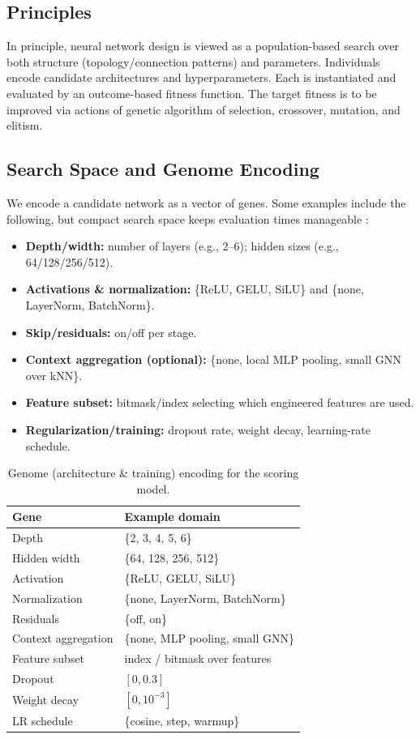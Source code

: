 \subsection{Principles}

In principle, neural network design is viewed as a population-based search over both structure (topology/connection patterns) and parameters. Individuals encode candidate architectures and hyperparameters. Each is instantiated and evaluated by an outcome-based fitness function. The target fitness is to be improved via actions of genetic algorithm of selection, crossover, mutation, and elitism.

\subsection{Search Space and Genome Encoding}

We encode a candidate network as a vector of genes. Some examples include the following, but compact search space keeps evaluation times manageable \cite{WSS+23}:

\begin{itemize}
    \item \textbf{Depth/width:} number of layers (e.g., 2--6); hidden sizes (e.g., 64/128/256/512).
    \item \textbf{Activations \& normalization:} \{ReLU, GELU, SiLU\} and \{none, LayerNorm, BatchNorm\}.
    \item \textbf{Skip/residuals:} on/off per stage.
    \item \textbf{Context aggregation (optional):} \{none, local MLP pooling, small GNN over kNN\}.
    \item \textbf{Feature subset:} bitmask/index selecting which engineered features are used.
    \item \textbf{Regularization/training:} dropout rate, weight decay, learning-rate schedule.
\end{itemize}

\begin{table}[h]
\centering
\caption{Genome (architecture \& training) encoding for the scoring model.}
\label{tab:genome}
\begin{tabular}{ll}
\hline
\textbf{Gene} & \textbf{Example domain} \\
\hline
Depth & \{2, 3, 4, 5, 6\} \\
Hidden width & \{64, 128, 256, 512\} \\
Activation & \{ReLU, GELU, SiLU\} \\
Normalization & \{none, LayerNorm, BatchNorm\} \\
Residuals & \{off, on\} \\
Context aggregation & \{none, MLP pooling, small GNN\} \\
Feature subset & index / bitmask over features \\
Dropout & $[0, 0.3]$ \\
Weight decay & $[0, 10^{-3}]$ \\
LR schedule & \{cosine, step, warmup\} \\
\hline
\end{tabular}
\end{table}


